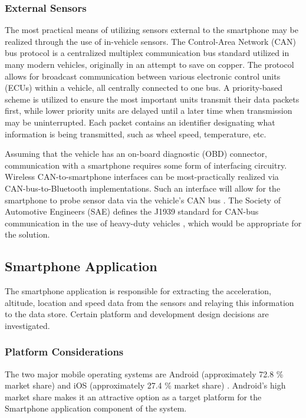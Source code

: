 \subsubsection{External Sensors}
The most practical means of utilizing sensors external to the smartphone may be realized through the use of in-vehicle sensors. 
The Control-Area Network (CAN) bus protocol is a centralized multiplex communication bus standard utilized in many modern vehicles, originally in an attempt to save on copper. 
The protocol allows for broadcast communication between various electronic control units (ECUs) within a vehicle, all centrally connected to one bus.
A priority-based scheme is utilized to ensure the most important units transmit their data packets first, while lower priority units are delayed until a later time when transmission may be uninterrupted. Each packet contains an identifier designating what information is being transmitted, such as wheel speed, temperature, etc.
\cite{van2011canauth}

Assuming that the vehicle has an on-board diagnostic (OBD) connector, communication with a smartphone requires some form of interfacing circuitry.
Wireless CAN-to-smartphone interfaces can be most-practically realized via CAN-bus-to-Bluetooth implementations.
Such an interface will allow for the smartphone to probe sensor data via the vehicle's CAN bus \cite{campolo2012smartcar} \cite{walter2013smartphone}.
The Society of Automotive Engineers (SAE) defines the J1939 standard for CAN-bus communication in the use of heavy-duty vehicles \cite{stepper1993j1939}, which would be appropriate for the solution.

\subsection{Smartphone Application}
The smartphone application is responsible for extracting the acceleration, altitude, location and speed data from the sensors and relaying this information to the data store.
Certain platform and development design decisions are investigated.

\subsubsection{Platform Considerations}
The two major mobile operating systems are Android (approximately 72.8 \% market share) and iOS (approximately 27.4 \% market share) \cite{statcountermaketshare}.
Android's high market share makes it an attractive option as a target platform for the Smartphone application component of the system.

